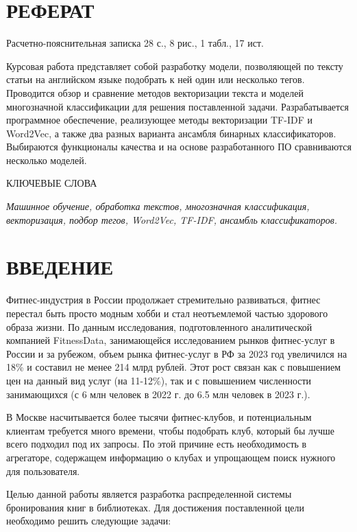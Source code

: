 \documentclass[a4paper, 12pt]{article}
\begin{document}
\begin{large}
    \section*{РЕФЕРАТ}
Расчетно-пояснительная записка 28 с., 8 рис., 1 табл., 17 ист.

Курсовая работа представляет собой разработку модели, позволяющей по тексту статьи на английском языке подобрать к ней один или несколько тегов. 
Проводится обзор и сравнение методов векторизации текста и моделей многозначной классификации для решения поставленной задачи. 
Разрабатывается программное обеспечение, реализующее методы векторизации TF-IDF и Word2Vec, а также два разных варианта ансамбля бинарных классификаторов.
Выбираются функционалы качества и на основе разработанного ПО сравниваются несколько моделей.

КЛЮЧЕВЫЕ СЛОВА

\textit{Машинное обучение, обработка текстов, многозначная классификация, векторизация, подбор тегов, Word2Vec, TF-IDF, ансамбль классификаторов.}

\newpage
\def\contentsname{СОДЕРЖАНИЕ}
\tableofcontents

\newpage
\section*{ВВЕДЕНИЕ}
Фитнес-индустрия в России продолжает стремительно развиваться, фитнес перестал быть просто модным хобби и стал неотъемлемой частью здорового образа жизни.
По данным исследования, подготовленного аналитической компанией FitnessData, занимающейся исследованием рынков фитнес-услуг в России и за рубежом, объем рынка фитнес-услуг в РФ за 2023 год увеличился на 18\% и составил не менее 214 млрд рублей. 
Этот рост связан как с повышением цен на данный вид услуг (на 11-12\%), так и с повышением численности занимающихся (с 6 млн человек в 2022 г. до 6.5 млн человек в 2023 г.).

В Москве насчитывается более тысячи фитнес-клубов, и потенциальным клиентам требуется много времени, чтобы подобрать клуб, который бы лучше всего подходил под их запросы. 
По этой причине есть необходимость в агрегаторе, содержащем информацию о клубах и упрощающем поиск нужного для пользователя.

Целью данной работы является разработка распределенной системы бронирования книг в библиотеках. 
Для достижения поставленной цели необходимо решить следующие задачи:


\end{large}
\end{document}
